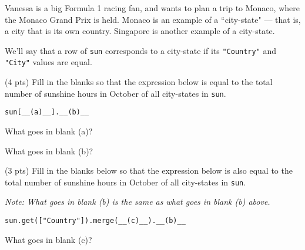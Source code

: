 \newpage

\begin{prob}[(7 pts)]

Vanessa is a big Formula 1 racing fan, and wants to plan a trip to Monaco, where the Monaco Grand Prix is held. Monaco is an example of a ``city-state" --- that is, a city that is its own country. Singapore is another example of a city-state.

We'll say that a row of \texttt{sun} corresponds to a city-state if its \texttt{"Country"} and \texttt{"City"} values are equal.

\begin{subprobset}

\begin{subprob}(4 pts) Fill in the blanks so that the expression below is equal to the total number of sunshine hours in October of all city-states in \texttt{sun}.

\begin{verbatim}
sun[__(a)__].__(b)__
\end{verbatim}

What goes in blank (a)?

\begin{responsebox}{0.5in}
    
\end{responsebox}

What goes in blank (b)?

\begin{responsebox}{0.5in}
    
\end{responsebox}

\end{subprob}

\begin{subprob}(3 pts) Fill in the blanks below so that the expression below is also equal to the total number of sunshine hours in October of all city-states in \texttt{sun}.

\textit{Note: What goes in blank (b) is the same as what goes in blank (b) above.}

\begin{verbatim}
sun.get(["Country"]).merge(__(c)__).__(b)__
\end{verbatim}

What goes in blank (c)?

\begin{responsebox}{0.5in}
    
\end{responsebox}

\end{subprob}
    
\end{subprobset}

\end{prob}

